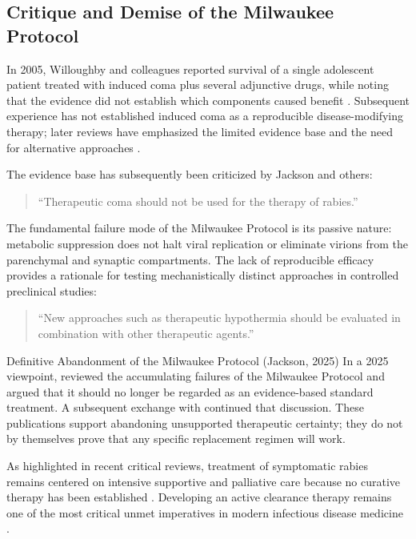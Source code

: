 \documentclass[12pt,a4paper]{article}
\begin{document}
\subsection{Critique and Demise of the Milwaukee Protocol}

In 2005, Willoughby and colleagues reported survival of a single adolescent patient treated with induced coma plus several adjunctive drugs, while noting that the evidence did not establish which components caused benefit \citep{willoughby2005}. Subsequent experience has not established induced coma as a reproducible disease-modifying therapy; later reviews have emphasized the limited evidence base and the need for alternative approaches \citep{jackson2011therapy, jackson2025demise}.

The evidence base has subsequently been criticized by Jackson and others:
\begin{quote}
``Therapeutic coma should not be used for the therapy of rabies.'' \citep{jackson2011therapy}
\end{quote}

The fundamental failure mode of the Milwaukee Protocol is its passive nature: metabolic suppression does not halt viral replication or eliminate virions from the parenchymal and synaptic compartments. The lack of reproducible efficacy provides a rationale for testing mechanistically distinct approaches in controlled preclinical studies:
\begin{quote}
``New approaches such as therapeutic hypothermia should be evaluated in combination with other therapeutic agents.'' \citep{jackson2011therapy}
\end{quote}

\begin{jacksonpearl}{Definitive Abandonment of the Milwaukee Protocol (Jackson, 2025)}
In a 2025 viewpoint, \citet{jackson2025demise} reviewed the accumulating failures of the Milwaukee Protocol and argued that it should no longer be regarded as an evidence-based standard treatment. A subsequent exchange with \citet{jackson2026reply} continued that discussion. These publications support abandoning unsupported therapeutic certainty; they do not by themselves prove that any specific replacement regimen will work.
\end{jacksonpearl}

As highlighted in recent critical reviews, treatment of symptomatic rabies remains centered on intensive supportive and palliative care because no curative therapy has been established \citep{lacy2024rabies}. Developing an active clearance therapy remains one of the most critical unmet imperatives in modern infectious disease medicine \citep{jackson2011therapy, jackson2025demise}.
\end{document}
